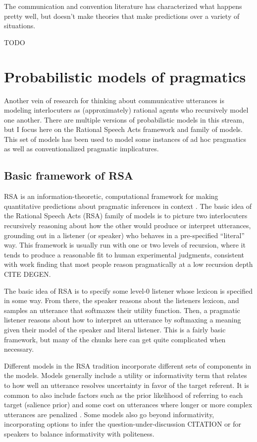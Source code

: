 \documentclass[]{article}
\begin{document}
The communication and convention literature has characterized what happens pretty well, but doesn't make theories that make predictions over a variety of situations. 

TODO

\section{Probabilistic models of pragmatics}

Another vein of research for thinking about communicative utterances is modeling interlocuters as (approximately) rational agents who recursively model one another. There are multiple versions of probabilistic models in this stream, but I focus here on the Rational Speech Acts framework and family of models. This set of models has been used to model some instances of ad hoc pragmatics as well as conventionalized pragmatic implicatures. 

\subsection{Basic framework of RSA}

RSA is an information-theoretic, computational framework for making quantitative predictions about pragmatic inferences in context \cite{goodman2016, frank2012a}. The basic idea of the Rational Speech Acts (RSA) family of models is to picture two interlocuters recursively reasoning about how the other would produce or interpret utterances, grounding out in a listener (or speaker) who behaves in a pre-specified ``literal'' way. This framework is usually run with one or two levels of recursion, where it tends to produce a reasonable fit to human experimental judgments, consistent with work finding that most people reason pragmatically at a low recursion depth CITE DEGEN. 

The basic idea of RSA is to specify some level-0 listener whose lexicon is specified in some way. From there, the speaker reasons about the listeners lexicon, and samples an utterance that softmaxes their utility function. Then, a pragmatic listener reasons about how to interpret an utterance by softmaxing a meaning given their model of the speaker and literal listener. This is a fairly basic framework, but many of the chunks here can get quite complicated when necessary. 

Different models in the RSA tradition incorporate different sets of components in the models. Models generally include a utility or informativity term that relates to how well an utterance resolves uncertainty in favor of the target referent.  It is common to also include factors such as the prior likelihood of referring to each target (salience prior) and some cost on utterances where longer or more complex utterances are penalized \cite{goodman2016}. Some models also go beyond informativity, incorporating options to infer the question-under-discussion CITATION or for speakers to balance informativity with politeness.
\end{document}
